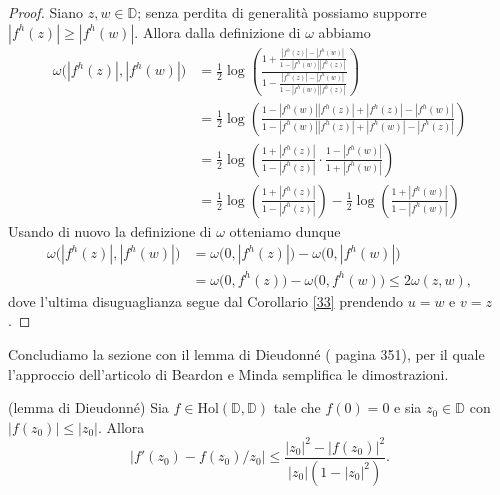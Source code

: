 \begin{proof}
  Siano $z, w \in \mathbb{D}$; senza perdita di generalità possiamo supporre $|f^h(z)| \ge |f^h(w)|$. Allora dalla definizione di $\omega$ abbiamo
  \begin{align*}
    \omega\bigl(|f^h(z)|, |f^h(w)|\bigr) & =\frac{1}{2}\log\left(\frac{1+\frac{|f^h(z)|-|f^h(w)|}{1-|f^h(w)||f^h(z)|}}{1-\frac{|f^h(z)|-|f^h(w)|}{1-|f^h(w)||f^h(z)|}}\right) \\
    & =\frac{1}{2}\log\left(\frac{1-|f^h(w)||f^h(z)|+|f^h(z)|-|f^h(w)|}{1-|f^h(w)||f^h(z)|+|f^h(w)|-|f^h(z)|}\right) \\
    & =\frac{1}{2}\log\left(\frac{1+|f^h(z)|}{1-|f^h(z)|}\cdot\frac{1-|f^h(w)|}{1+|f^h(w)|}\right) \\
    & =\frac{1}{2}\log\left(\frac{1+|f^h(z)|}{1-|f^h(z)|}\right)-\frac{1}{2}\log\left(\frac{1+|f^h(w)|}{1-|f^h(w)|}\right)
  \end{align*}
  Usando di nuovo la definizione di $\omega$ otteniamo dunque
  \begin{align*}
    \omega\bigl(|f^h(z)|, |f^h(w)|\bigr)&=\omega\bigl(0,|f^h(z)|\bigr)-\omega\bigl(0,|f^h(w)|\bigr) \\
    & =\omega\bigl(0,f^h(z)\bigr)-\omega\bigl(0,f^h(w)\bigr) \le 2\omega(z,w),
  \end{align*}
  dove l'ultima disuguaglianza segue dal Corollario \ref{33} prendendo $u=w$ e $v=z$.
\end{proof}

Concludiamo la sezione con il lemma di Dieudonné (\cite{D} pagina 351), per il quale l'approccio dell'articolo di Beardon e Minda semplifica le dimostrazioni.

\begin{lm}
  (lemma di Dieudonné) Sia $f \in \text{Hol}(\mathbb{D},\mathbb{D})$ tale che $f(0)=0$ e sia $z_0 \in \mathbb{D}$ con $|f(z_0)| \le |z_0|$. Allora
  \begin{equation}
    |f'(z_0)-f(z_0)/z_0| \le \frac{|z_0|^2-|f(z_0)|^2}{|z_0|(1-|z_0|^2)}.
  \end{equation}
\end{lm}

